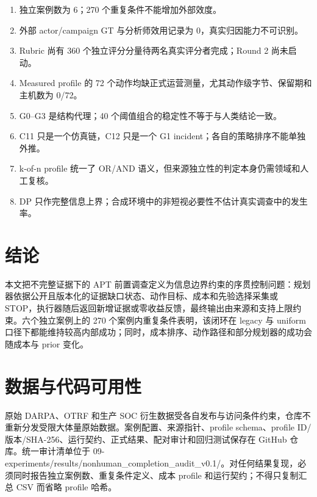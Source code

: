 \documentclass[conference,a4paper,10pt]{IEEEtran}
\begin{document}
\begin{enumerate}[leftmargin=*,label=(\arabic*)]
  \item 独立案例数为 6；270 个重复条件不能增加外部效度。
  \item 外部 actor/campaign GT 与分析师效用记录为 0，真实归因能力不可识别。
  \item Rubric 尚有 360 个独立评分分量待两名真实评分者完成；Round 2 尚未启动。
  \item Measured profile 的 72 个动作均缺正式运营测量，尤其动作级字节、保留期和主机数为 0/72。
  \item G0–G3 是结构代理；40 个阈值组合的稳定性不等于与人类结论一致。
  \item C11 只是一个仿真链，C12 只是一个 G1 incident；各自的策略排序不能单独外推。
  \item k-of-n profile 统一了 OR/AND 语义，但来源独立性的判定本身仍需领域和人工复核。
  \item DP 只作完整信息上界；合成环境中的非短视必要性不估计真实调查中的发生率。
\end{enumerate}

\section{结论}
本文把不完整证据下的 APT 前置调查定义为信息边界约束的序贯控制问题：规划器依据公开且版本化的证据缺口状态、动作目标、成本和先验选择采集或 STOP，执行器随后返回新增证据或零收益反馈，最终输出由来源和支持上限约束。六个独立案例上的 270 个案例内重复条件表明，该闭环在 legacy 与 uniform 口径下都能维持较高内部成功；同时，成本排序、动作路径和部分规划器的成功会随成本与 prior 变化。

\section*{数据与代码可用性}
原始 DARPA、OTRF 和生产 SOC 衍生数据受各自发布与访问条件约束，仓库不重新分发受限大体量原始数据。案例配置、来源指针、profile schema、profile ID/版本/SHA-256、运行契约、正式结果、配对审计和回归测试保存在 GitHub 仓库。统一审计清单位于 09-experiments/results/nonhuman\_completion\_audit\_v0.1/。对任何结果复现，必须同时报告独立案例数、重复条件定义、成本 profile 和运行契约；不得只复制汇总 CSV 而省略 profile 哈希。
\end{document}
